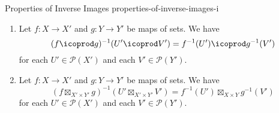 \begin{proposition}{Properties of Inverse Images \rmI}{properties-of-inverse-images-i}
\begin{enumerate}
\[                (\mathcal{P}(Y),\cap,Y)
                \to
                (\mathcal{P}(X),\cap,X),
            \]%
            being equipped with equalities%
            \[
                \begin{gathered}
                    f^{-1,\otimes}_{U,V}   \colon f^{-1}(U)\cap f^{-1}(V) \rightequalsarrow f^{-1}(U\cap V),\\
                    f^{-1,\otimes}_{\Unit} \colon X                       \rightequalsarrow f^{-1}(Y),
                \end{gathered}
            \]%
            natural in $U,V\in\mathcal{P}(Y)$.
        \item\label{properties-of-inverse-images-i-interaction-with-coproducts}Let $f\colon X\to X'$ and $g\colon Y\to Y'$ be maps of sets. We have
            \[
                (f\icoprod g)^{-1}(U'\icoprod V')%
                =%
                f^{-1}(U')\icoprod g^{-1}(V')
            \]%
            for each $U'\in\mathcal{P}(X')$ and each $V'\in\mathcal{P}(Y')$.
        \item\label{properties-of-inverse-images-i-interaction-with-products}Let $f\colon X\to X'$ and $g\colon Y\to Y'$ be maps of sets. We have
            \[
                (f\boxtimes_{X'\times Y'}g)^{-1}(U'\boxtimes_{X'\times Y'} V')%
                =%
                f^{-1}(U')\boxtimes_{X\times Y} g^{-1}(V')%
            \]%
            for each $U'\in\mathcal{P}(X')$ and each $V'\in\mathcal{P}(Y')$.
    \end{enumerate}
\end{proposition}
